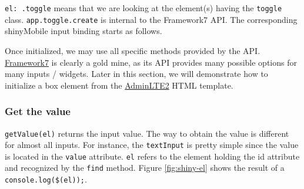 \documentclass[
]{book}
\newenvironment{Shaded}{\begin{snugshade}}{\end{snugshade}}
\newcommand{\AttributeTok}[1]{\textcolor[rgb]{0.77,0.63,0.00}{#1}}
\newcommand{\CommentTok}[1]{\textcolor[rgb]{0.56,0.35,0.01}{\textit{#1}}}
\newcommand{\DataTypeTok}[1]{\textcolor[rgb]{0.13,0.29,0.53}{#1}}
\newcommand{\KeywordTok}[1]{\textcolor[rgb]{0.13,0.29,0.53}{\textbf{#1}}}
\newcommand{\NormalTok}[1]{#1}
\newcommand{\OperatorTok}[1]{\textcolor[rgb]{0.81,0.36,0.00}{\textbf{#1}}}
\newcommand{\VariableTok}[1]{\textcolor[rgb]{0.00,0.00,0.00}{#1}}
\begin{document}
\texttt{el:\ \textquotesingle{}.toggle\textquotesingle{}} means that we are looking at the element(s) having the \texttt{toggle} class. \texttt{app.toggle.create} is internal to the Framework7 API. The corresponding shinyMobile input binding starts as follows.

\begin{Shaded}
\end{Shaded}

Once initialized, we may use all specific methods provided by the API. \href{https://framework7.io}{Framework7} is clearly a gold mine, as its API provides many possible options for many inputs / widgets. Later in this section, we will demonstrate how to initialize a box element from the \href{https://adminlte.io/docs/2.4/js-box-widget}{AdminLTE2} HTML template.

\hypertarget{get-the-value}{%
\subsubsection{Get the value}\label{get-the-value}}

\texttt{getValue(el)} returns the input value. The way to obtain the value is different for almost all inputs. For instance, the \texttt{textInput} is pretty simple since the value is located in the \texttt{value} attribute. \texttt{el} refers to the element holding the id attribute and recognized by the \texttt{find} method. Figure \ref{fig:shiny-el} shows the result of a \texttt{console.log(\$(el));}.
\end{document}
